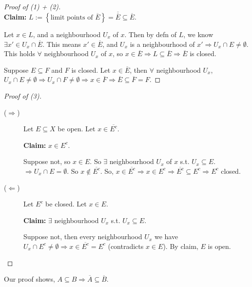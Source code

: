 \begin{proof}[Proof of (1) + (2)] \mbox{} \\
    \textbf{Claim:} $L := \left\{ \text{limit points of } \overline{E} \right\} = 
    \overline{\overline{E}} \subseteq \overline{E}$.

    Let $x \in L$, and a neighbourhood $U_x$ of $x$. Then by defn of $L$, we know $\exists x' \in
    U_x \cap \overline{E}$. This means $x' \in \overline{E}$, and $U_x$ is a neighbourhood of $x'
    \Rightarrow U_x \cap E \neq \emptyset$. This holds $\forall$ neighbourhood $U_x$ of $x$, so 
    $x \in \overline{E} \Rightarrow L \subseteq \overline{E} \Rightarrow \overline{E}$ is closed. 
    
    Suppose $E \subseteq F$ and $F$ is closed. Let $x \in \overline{E}$, then $\forall$ neighbourhood 
    $U_x$, $U_x \cap E \neq \emptyset \Rightarrow U_x \cap F \neq \emptyset \Rightarrow 
    x \in \overline{F} \Rightarrow \overline{E} \subseteq \overline{F} = F$. 
\end{proof}

\begin{proof}[Proof of (3)] \leavevmode
    \begin{description}
        \item[($\Rightarrow$)] Let $E \subseteq X$ be open. Let $x \in \overline{E^c}$.
    
        \textbf{Claim:} $x \in E^c$.

        Suppose not, so $x \in E$. So $\exists$ neighbourhood $U_x$ of $x$ s.t. $U_x \subseteq E$.
        $\Rightarrow U_x \cap E = \emptyset$. So $x \notin \overline{E^c}$. 
        So, $x \in \overline{E^c} \Rightarrow x \in E^c \Rightarrow \overline{E^c} \subseteq E^c
        \Rightarrow E^c$ closed.
        
        \item[($\Leftarrow$)] Let $E^c$ be closed. Let $x \in E$.

        \textbf{Claim:} $\exists$ neighbourhood $U_x$ s.t. $U_x \subseteq E$.
        
        Suppose not, then every neighbourhood $U_x$ we have $U_x \cap E^c \neq \emptyset
        \Rightarrow x \in \overline{E^c} = E^c$ (contradicts $x \in E$).
        By claim, $E$ is open.  \qedhere
    \end{description}
\end{proof}

\begin{rem}
    Our proof shows, $A \subseteq B \Rightarrow \overline{A} \subseteq \overline{B}$. 
\end{rem}

